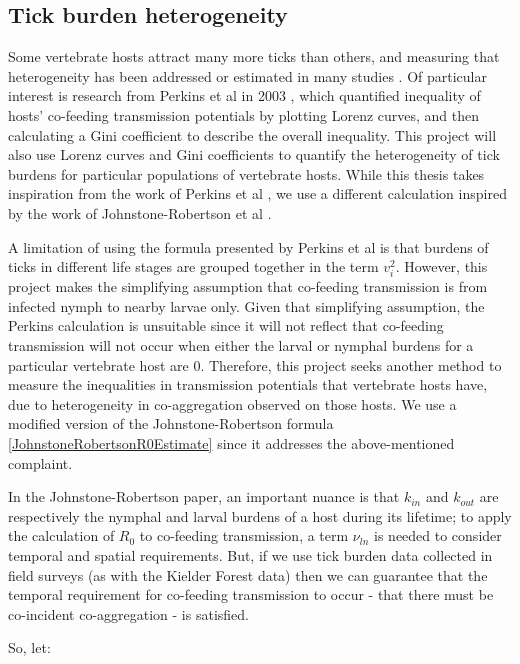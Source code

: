 \documentclass{article}
\begin{document}
\subsection{Tick burden heterogeneity} 

Some vertebrate hosts attract many more ticks than others, and measuring that heterogeneity has been addressed or estimated in many studies \cite{Woolhouse1997,  Perkins_2003, Brunner2008, DEVEVEY_2012}. Of particular interest is research from Perkins et al in 2003 \cite{Perkins_2003}, which quantified inequality of hosts' co-feeding transmission potentials by plotting Lorenz curves, and then calculating a Gini coefficient to describe the overall inequality. This project will also use Lorenz curves and Gini coefficients to quantify the heterogeneity of tick burdens for particular populations of vertebrate hosts. While this thesis takes inspiration from the work of Perkins et al \cite{Perkins_2003}, we use a different calculation inspired by the work of Johnstone-Robertson et al \cite{JohnstoneRobertson2020}.

A limitation of using the formula presented by Perkins et al is that burdens of ticks in different life stages are grouped together in the term $ v_i^2 $. However, this project makes the simplifying assumption that co-feeding transmission is from infected nymph to nearby larvae only. Given that simplifying assumption, the Perkins calculation is unsuitable since it will not reflect that co-feeding transmission will not occur when either the larval or nymphal burdens for a particular vertebrate host are $ 0 $. Therefore, this project seeks another method to measure the inequalities in transmission potentials that vertebrate hosts have, due to heterogeneity in co-aggregation observed on those hosts. We use a modified version of the Johnstone-Robertson formula \eqref{JohnstoneRobertsonR0Estimate} since it addresses the above-mentioned complaint.

In the Johnstone-Robertson paper, an important nuance is that $ k_{in} $ and $ k_{out} $ are respectively the nymphal and larval burdens of a host during its lifetime; to apply the calculation of $ R_0 $ to co-feeding transmission, a term $ \nu_{ln} $ is needed to consider temporal and spatial requirements. But, if we use tick burden data collected in field surveys (as with the Kielder Forest data) then we can guarantee that the temporal requirement for co-feeding transmission to occur - that there must be co-incident co-aggregation - is satisfied.

So, let:
\end{document}
